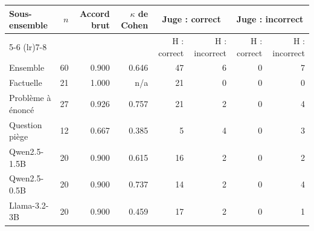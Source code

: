 \begin{tabular}{lrrrrrrr}
\toprule
Sous-ensemble & $n$ & Accord brut & $\kappa$ de Cohen & \multicolumn{2}{c}{Juge : correct} & \multicolumn{2}{c}{Juge : incorrect} \\
\cmidrule(lr){5-6} \cmidrule(lr){7-8}
 &  &  &  & H : correct & H : incorrect & H : correct & H : incorrect \\
\midrule
Ensemble & 60 & 0.900 & 0.646 & 47 & 6 & 0 & 7 \\
Factuelle & 21 & 1.000 & n/a & 21 & 0 & 0 & 0 \\
Problème à énoncé & 27 & 0.926 & 0.757 & 21 & 2 & 0 & 4 \\
Question piège & 12 & 0.667 & 0.385 & 5 & 4 & 0 & 3 \\
Qwen2.5-1.5B & 20 & 0.900 & 0.615 & 16 & 2 & 0 & 2 \\
Qwen2.5-0.5B & 20 & 0.900 & 0.737 & 14 & 2 & 0 & 4 \\
Llama-3.2-3B & 20 & 0.900 & 0.459 & 17 & 2 & 0 & 1 \\
\bottomrule
\end{tabular}
